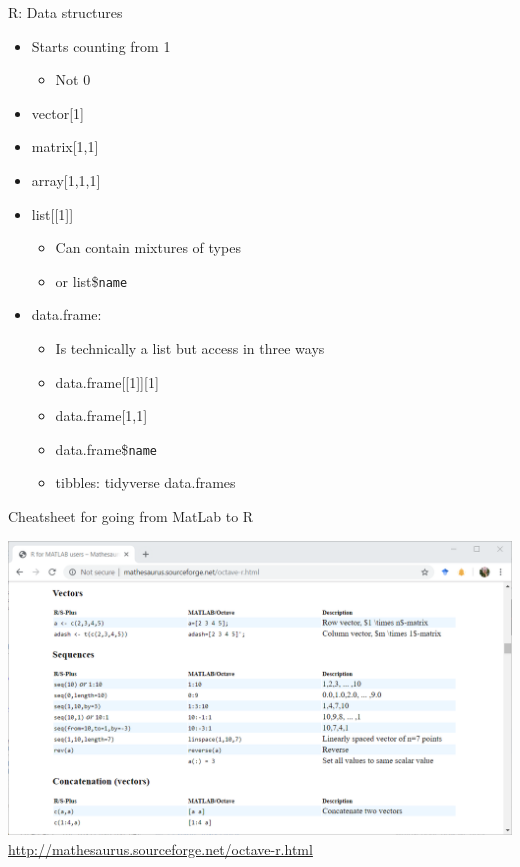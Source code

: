 \documentclass[
  ignorenonframetext,
]{beamer}
\providecommand{\tightlist}{%
  \setlength{\itemsep}{0pt}\setlength{\parskip}{0pt}}
\begin{document}
\begin{frame}[fragile]{R: Data structures}
\protect\hypertarget{r-data-structures}{}

\begin{itemize}
\tightlist
\item
  Starts counting from 1

  \begin{itemize}
  \tightlist
  \item
    Not 0
  \end{itemize}
\item
  vector{[}1{]}
\item
  matrix{[}1,1{]}
\item
  array{[}1,1,1{]}
\item
  list{[}{[}1{]}{]}

  \begin{itemize}
  \tightlist
  \item
    Can contain mixtures of types
  \item
    or list\$\texttt{name}
  \end{itemize}
\item
  data.frame:

  \begin{itemize}
  \tightlist
  \item
    Is technically a list but access in three ways
  \item
    data.frame{[}{[}1{]}{]}{[}1{]}
  \item
    data.frame{[}1,1{]}
  \item
    data.frame\$\texttt{name}
  \item
    tibbles: tidyverse data.frames
  \end{itemize}
\end{itemize}

\end{frame}

\begin{frame}{Cheatsheet for going from MatLab to R}
\protect\hypertarget{cheatsheet-for-going-from-matlab-to-r}{}

\includegraphics{../external/images/r_cheatsheet_matlab.PNG}
\url{http://mathesaurus.sourceforge.net/octave-r.html}

\end{frame}
\end{document}
